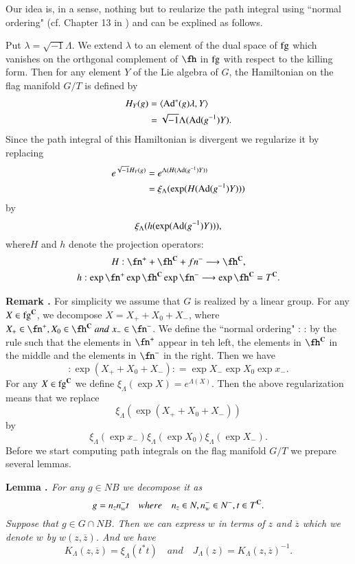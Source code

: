 Our idea is, in a sense, nothing but to reularize the path integral using ``normal ordering" (cf. Chapter 13 in \cite{chap15-key10}) and can be explined as follows.

Put $\lambda = \sqrt{-1}\Lambda$. We extend $\lambda$ to an element of the dual space of $\operatorname{fg}$ which vanishes on the orthgonal complement of $\fh$ in $\operatorname{fg}$ with respect to the killing form. Then for any element $Y$ of the Lie algebra of $G$, the Hamiltonian on the flag manifold $G/T$ is defined by
\begin{align*}
H_{Y}(g)&=\langle \operatorname{Ad}^{*}(g)\lambda, Y\rangle\\
&= \sqrt{-1}\Lambda(\operatorname{Ad}(g^{-1})Y).
\end{align*}
Since the path integral of this Hamiltonian is divergent we regularize it by replacing
\begin{align*}
e^{\sqrt{-1}H_{Y}(g)}&= e^{\Lambda(H(\operatorname{Ad}(g^{-1})Y))}\\
& = \xi_{\Lambda}(\exp(H(\operatorname{Ad}(g^{-1})Y)))
\end{align*}
by
$$
\xi_{\Lambda}(h(\exp(\operatorname{Ad}(g^{-1})Y))),
$$
where$H$ and $h$ denote the projection operators:
\begin{gather*}
H : \fn^{+} + \fh^{\bC}+ fn^{-}\longrightarrow \fh^{\bC},\\
h : \exp \fn^{+} \exp \fh^{\bC} \exp \fn^{-} \longrightarrow \exp \fh^{\bC} =T^{\bC}.
\end{gather*}

\medskip
\noindent
{\bfseries Remark . \label{chap15-remark-1}} For simplicity we assume that $G$ is realized by a linear group. For any $X\in \operatorname{fg}^{\mathbf{C}}$, we decompose $X=X_{+}+X_{0}+X_{-}$, where $X_{+}\in \fn^{+}, X_{0} \in \fh^{\bC} \;and \; x_{-} \in \fn^{-}$. We define the ``normal ordering" : : by the rule such that the elements in $\fn^{+}$ appear in teh left, the elements in $\fh^{\bC}$ in the middle and the elements in $\fn^{-}$ in the right. Then we have
$$
: \exp (X_{+} + X_{0} + X_{-}): =\exp X_{-}\exp X_{0} \exp x_{-}.
$$ 
For any $X \in \operatorname{fg}^{\mathbf{C}}$ we define $\xi_{\Lambda}(\exp X) = e^{\Lambda(X)}$. Then the above regularization means that we replace
$$
\xi_{\Lambda}(\exp(X_{+}+ X_{0}+ X_{-}))
$$
by\pageoriginale
$$
\xi_{\Lambda}(\exp x_{-})\xi_{\Lambda}(\exp X_{0})\xi_{\Lambda}(\exp X_{-}).
$$
Before we start computing path integrals on the flag manifold $G/T$ we prepare several lemmas.

\medskip
\noindent
{\bfseries Lemma . \label{chap15-lemma-2}} \textit{For any $g \in N B$ we decompose it as}
$$
g =n_{z}n_{w}^{-}t \quad where \quad n_{z} \in N, n_{w}^{-} \in N^{-}, t \in T^{\mathbf{C}}.
$$
\textit{Suppose that $g \in G \cap N B$. Then we can express $w$ in terms of $z$ and $\overline{z}$ which we denote $w$ by $w(z,\overline{z})$. And we have}
$$
K_{\Lambda}(z, \overline{z})= \xi_{\Lambda}(t^{*}t) \quad and \quad J_{\Lambda}(z)=K_{\Lambda}(z, \overline{z})^{-1}.
$$

